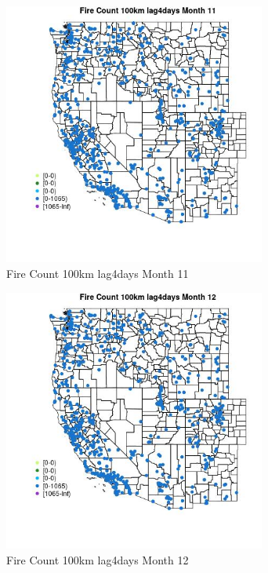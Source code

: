 \begin{figure} 
\centering  
\includegraphics[width=0.77\textwidth]{Code_Outputs/Report_ML_input_PM25_Step4_part_f_de_duplicated_aves_prioritize_24hr_obswNAs_MapObsMo11Fire_Count_100km_lag4days.jpg} 
\caption{\label{fig:Report_ML_input_PM25_Step4_part_f_de_duplicated_aves_prioritize_24hr_obswNAsMapObsMo11Fire_Count_100km_lag4days}Fire Count 100km lag4days Month 11} 
\end{figure} 
 

\clearpage 

\begin{figure} 
\centering  
\includegraphics[width=0.77\textwidth]{Code_Outputs/Report_ML_input_PM25_Step4_part_f_de_duplicated_aves_prioritize_24hr_obswNAs_MapObsMo12Fire_Count_100km_lag4days.jpg} 
\caption{\label{fig:Report_ML_input_PM25_Step4_part_f_de_duplicated_aves_prioritize_24hr_obswNAsMapObsMo12Fire_Count_100km_lag4days}Fire Count 100km lag4days Month 12} 
\end{figure} 
 

